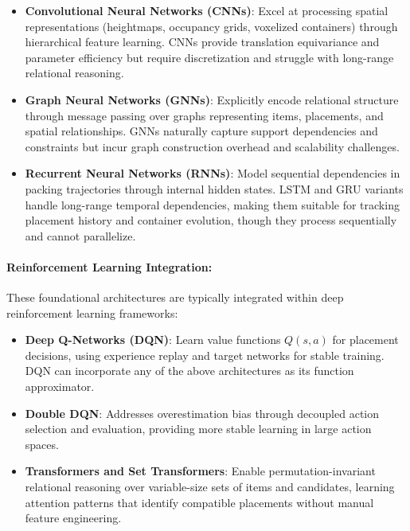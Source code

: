\begin{itemize}
\item \textbf{Convolutional Neural Networks (CNNs)}: Excel at processing spatial representations (heightmaps, occupancy grids, voxelized containers) through hierarchical feature learning. CNNs provide translation equivariance and parameter efficiency but require discretization and struggle with long-range relational reasoning.

\item \textbf{Graph Neural Networks (GNNs)}: Explicitly encode relational structure through message passing over graphs representing items, placements, and spatial relationships. GNNs naturally capture support dependencies and constraints but incur graph construction overhead and scalability challenges.

\item \textbf{Recurrent Neural Networks (RNNs)}: Model sequential dependencies in packing trajectories through internal hidden states. LSTM and GRU variants handle long-range temporal dependencies, making them suitable for tracking placement history and container evolution, though they process sequentially and cannot parallelize.
\end{itemize}

\paragraph{Reinforcement Learning Integration:}

These foundational architectures are typically integrated within deep reinforcement learning frameworks:

\begin{itemize}
\item \textbf{Deep Q-Networks (DQN)}: Learn value functions $Q(s, a)$ for placement decisions, using experience replay and target networks for stable training. DQN can incorporate any of the above architectures as its function approximator.

\item \textbf{Double DQN}: Addresses overestimation bias through decoupled action selection and evaluation, providing more stable learning in large action spaces.

\item \textbf{Transformers and Set Transformers}: Enable permutation-invariant relational reasoning over variable-size sets of items and candidates, learning attention patterns that identify compatible placements without manual feature engineering.
\end{itemize}

